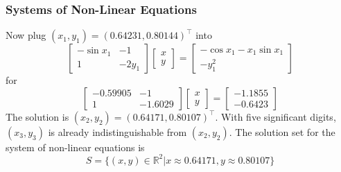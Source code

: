 \documentclass[xcolor=dvipsnames]{beamer}
\begin{document}
\begin{frame}
  \frametitle{Systems of Non-Linear Equations}
  Now plug $(x_{1},y_{1})=(0.64231,0.80144)^{\intercal}$ into
  \begin{equation}
    \label{eq:ooyaiche}
    \left[
    \begin{array}{cc}
      -\sin{}x_{1}&-1 \\
                  1&-2y_{1}
    \end{array}\right]\left[
    \begin{array}{c}
      x \\
      y
    \end{array}\right]=\left[
    \begin{array}{c}
      -\cos{}x_{1}-x_{1}\sin{}x_{1} \\
      -y_{1}^{2}
    \end{array}\right]
  \end{equation}
  for
  \begin{equation}
    \label{eq:ietahsai}
    \left[
      \begin{array}{cc}
        -0.59905 & -1 \\
        1 & -1.6029
      \end{array}\right]\left[
      \begin{array}{c}
        x\\
        y
      \end{array}\right]=\left[
      \begin{array}{c}
        -1.1855 \\
        -0.6423
      \end{array}\right]
  \end{equation}
  The solution is $(x_{2},y_{2})=(0.64171,0.80107)^{\intercal}$. With
  five significant digits, $(x_{3},y_{3})$ is already
  indistinguishable from $(x_{2},y_{2})$. The solution set for the
  system of non-linear equations is
  \begin{equation}
    \label{eq:xiepudei}
    S=\{(x,y)\in\mathbb{R}^{2}|x\approx{}0.64171,y\approx{}0.80107\}
  \end{equation}
\end{frame}
\end{document}
